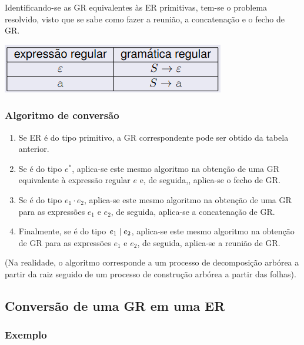 \documentclass{article}
\begin{document}
\begin{flushleft}
  \item Identificando-se as GR equivalentes às ER primitivas, tem-se o problema resolvido, visto
  que se sabe como fazer a reunião, a concatenação e o fecho de GR.

  \begin{center}
    \includegraphics[scale=0.4]{22}
  \end{center}

  \pagebreak

  \subsubsection{Algoritmo de conversão}

  \begin{enumerate}
    \item Se ER é do tipo primitivo, a GR correspondente pode ser obtido da tabela anterior.
    \item Se é do tipo $e^*$, aplica-se este mesmo algoritmo na obtenção de uma GR equivalente
    à expressão regular $e$ e, de seguida,, aplica-se o fecho de GR.
    \item Se é do tipo $e_1 \cdot e_2$, aplica-se este mesmo algoritmo na obtenção de uma GR para
    as expressões $e_1$ e $e_2$, de seguida, aplica-se a concatenação de GR.
    \item Finalmente, se é do tipo $e_1 \hspace{1mm} | \hspace{1mm} e_2$, aplica-se este mesmo algoritmo na
    obtenção de GR para as expressões $e_1$ e $e_2$, de seguida, aplica-se a reunião de GR.
  \end{enumerate}

  \item (Na realidade, o algoritmo corresponde a um processo de decomposição arbórea a partir
  da raiz seguido de um processo de construção arbórea a partir das folhas).

  \subsection{Conversão de uma GR em uma ER}

  \subsubsection{Exemplo}


\end{flushleft}
\end{document}
